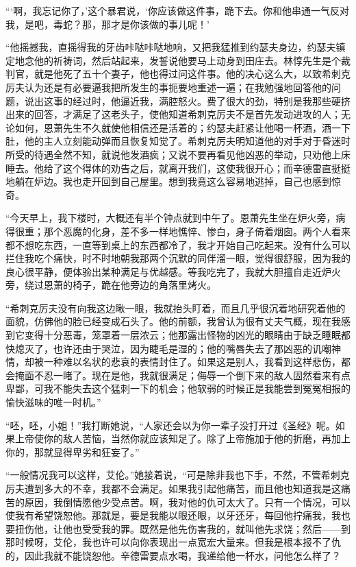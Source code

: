 \par “‘啊，我忘记你了，’这个暴君说，‘你应该做这件事，跪下去。你和他串通一气反对我，是吧，毒蛇？那，那才是你该做的事儿呢！’
\par “他摇撼我，直摇得我的牙齿咔哒咔哒地响，又把我猛推到约瑟夫身边，约瑟夫镇定地念他的祈祷词，然后站起来，发誓说他要马上动身到田庄去。林惇先生是个裁判官，就是他死了五十个妻子，他也得过问这件事。他的决心这么大，以致希刺克厉夫认为还是有必要逼我把所发生的事扼要地重述一遍；在我勉强地回答他的问题，说出这事的经过时，他逼近我，满腔怒火。费了很大的劲，特别是我那些硬挤出来的回答，才满足了这老头子，使他知道希刺克厉夫不是首先发动进攻的人；无论如何，恩萧先生不久就使他相信还是活着的；约瑟夫赶紧让他喝一杯酒，酒一下肚，他的主人立刻能动弹而且恢复知觉了。希刺克厉夫明知道他的对手对于昏迷时所受的待遇全然不知，就说他发酒疯；又说不要再看见他凶恶的举动，只劝他上床睡去。他给了这个得体的劝告之后，就离开我们，这使我很开心；而辛德雷直挺挺地躺在炉边。我也走开回到自己屋里。想到我竟这么容易地逃掉，自己也感到惊奇。
\par “今天早上，我下楼时，大概还有半个钟点就到中午了。恩萧先生坐在炉火旁，病得很重；那个恶魔的化身，差不多一样地憔悴、惨白，身子倚着烟囱。两个人看来都不想吃东西，一直等到桌上的东西都冷了，我才开始自己吃起来。没有什么可以拦住我吃个痛快，时不时地朝我那两个沉默的同伴溜一眼，觉得很舒服，因为我的良心很平静，便体验出某种满足与优越感。等我吃完了，我就大胆擅自走近炉火旁，绕过恩萧的椅子，跪在他旁边的角落里烤火。
\par “希刺克厉夫没有向我这边瞅一眼，我就抬头盯着，而且几乎很沉着地研究着他的面貌，仿佛他的脸已经变成石头了。他的前额，我曾认为很有丈夫气概，现在我感到它变得十分恶毒，笼罩着一层浓云；他那露出怪物的凶光的眼睛由于缺乏睡眠都快熄灭了，也许还由于哭泣，因为睫毛是湿的；他的嘴唇失去了那凶恶的讥嘲神情，却被一种难以名状的悲哀的表情封住了。如果这是别人，我看到这样悲伤，都会掩面不忍一睹了。现在是他，我就很满足；侮辱一个倒下来的敌人固然看来有点卑鄙，可我不能失去这个猛刺一下的机会；他软弱的时候正是我能尝到冤冤相报的愉快滋味的唯一时机。”
\par “呸，呸，小姐！”我打断她说，“人家还会以为你一辈子没打开过《圣经》呢。如果上帝使你的敌人苦恼，当然你就应该知足了。除了上帝施加于他的折磨，再加上你的，那就显得卑劣和狂妄了。”
\par “一般情况我可以这样，艾伦。”她接着说，“可是除非我也下手，不然，不管希刺克厉夫遭到多大的不幸，我都不会满足。如果我引起他痛苦，而且他也知道我是这痛苦的原因，我倒情愿他少受点苦。啊，我对他的仇可太大了。只有一个情况，可以使我有希望饶恕他。那就是，要是我能以眼还眼，以牙还牙，每回他拧痛我，我也要扭伤他，让他也受受我的罪。既然是他先伤害我的，就叫他先求饶；然后——到那时候呀，艾伦，我也许可以向你表现出一点宽宏大量来。但我是根本报不了仇的，因此我就不能饶恕他。辛德雷要点水喝，我递给他一杯水，问他怎么样了？
